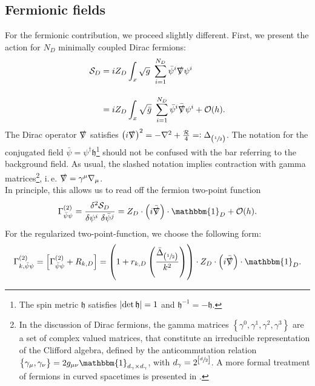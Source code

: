 \subsection{Fermionic  fields}
For the fermionic contribution, we  proceed slightly different. First, we present the action for $N_D$ minimally coupled Dirac fermions:
\begin{equation}
	\begin{aligned}
		\mathcal{S}_D &= iZ_D\int_x \sqrt{g} \ \sum\limits_{i=1}^{N_D}\bar{\psi}^{i}\slashed{\nabla}\psi^{i} \\[10pt]
		&=  iZ_D\int_x \sqrt{\bar{g}} \ \sum\limits_{i=1}^{N_D}\bar{\psi}^{i}\bar{\slashed{\nabla}}\psi^{i} + \mathcal{O}(h).
	\end{aligned}
\end{equation}
The Dirac operator $\slashed{\nabla}$ satisfies $\left(i\slashed{\nabla}\right)^2 = -\nabla^2 + \frac{\mathcal{R}}{4} =: \Delta_{\left(\sfrac{1}{2}\right)}$.
The notation for the conjugated field $\bar{\psi} = \psi^{\dagger}\mathfrak{h}$\footnote{The spin metric $\mathfrak{h}$ satisfies $\abs{\operatorname{det} \mathfrak{h}} = 1$ and $\mathfrak{h}^{-1} = -\mathfrak{h}$.} should not be confused with the bar referring to the background field. As usual, the slashed notation implies contraction with gamma matrices\footnote{In the discussion of Dirac fermions, the gamma matrices $\left\{\gamma^0, \gamma^1, \gamma^2, \gamma^3\right\}$ are a set of complex valued matrices, that constitute an irreducible representation of the Clifford algebra, defined by the anticommutation relation $\left\{\gamma_{\mu}, \gamma_{\nu}\right\}= 2g_{\mu\nu} \mathbbm{1}_{d_{\gamma}\times d_{\gamma}}$, with $d_{\gamma} = 2^{\left[\sfrac{d}{2}\right]}$. A more formal treatment of fermions in curved spacetimes is presented in \cite{LippoldtPHD}.}, i.\,e. $\slashed{\nabla} = \gamma^{\mu}\nabla_{\mu}$.  \\
In principle, this allows us to read off the fermion two-point function
\begin{align}
	\Gamma^{(2)}_{\bar{\psi}\psi} = \frac{\delta^2 \mathcal{S}_D}{\delta \psi^{i}\ \delta \bar{\psi}^{j}} = Z_D\cdot\left(i\bar{\slashed{\nabla}}\right)\cdot\mathbbm{1}_D + \mathcal{O}(h).
\end{align}
For the regularized two-point-function, we choose the following form:
\begin{equation}
\Gamma^{(2)}_{k, \bar{\psi}\psi} = \left[\Gamma^{(2)}_{\bar{\psi}\psi} + R_{k,D}\right] = \left(1+r_{k,D}\left(\frac{ \bar{\Delta}_{\left(\sfrac{1}{2}\right)}}{k^2}\right)\right)\cdot Z_D\cdot\left(i\bar{\slashed{\nabla}}\right)\cdot\mathbbm{1}_D. \label{eqn:fermion_propagator}
\end{equation}
